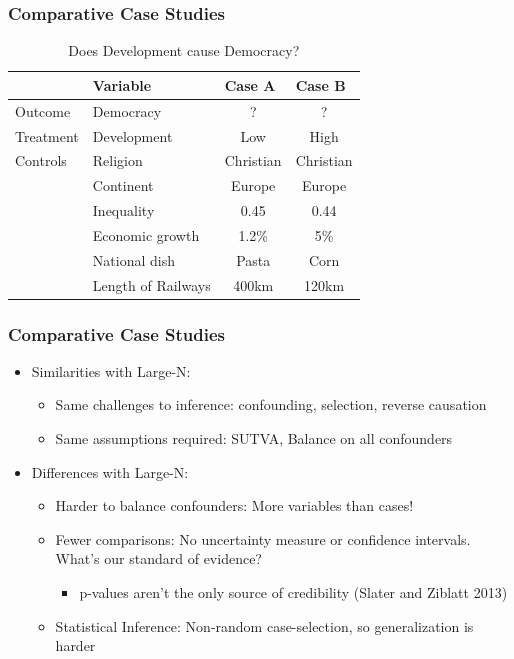 \documentclass[xcolor=x11names,compress]{beamer}\usepackage[]{graphicx}\usepackage[]{color}
\renewcommand{\(}{\begin{columns}}
\renewcommand{\)}{\end{columns}}
\newcommand{\<}[1]{\begin{column}{#1}}
\renewcommand{\>}{\end{column}}
\begin{document}
\begin{frame}
\frametitle{Comparative Case Studies}
\begin{table}[htbp]
  \centering
  \caption{Does Development cause Democracy?}
    \begin{tabular}{|r|l|c|c|}
    \hline
          & Variable & \multicolumn{1}{l|}{Case A} & \multicolumn{1}{l|}{Case B} \bigstrut\\
    \hline
    \multicolumn{1}{|l|}{Outcome} & Democracy & ?     & ? \bigstrut\\
    \hline
    \multicolumn{1}{|l|}{Treatment} & Development & Low   & High \bigstrut\\
    \hline
    \multicolumn{1}{|l|}{Controls} & Religion & Christian & Christian \bigstrut\\
    \hline
          & Continent & Europe & Europe \bigstrut\\
    \hline
          & Inequality & 0.45  & 0.44 \bigstrut\\
    \hline
          & Economic growth & 1.2\% & 5\% \bigstrut\\
    \hline
          & National dish & Pasta & Corn \bigstrut\\
    \hline
          & Length of Railways & 400km & 120km \bigstrut\\
    \hline
    \end{tabular}%
  \label{tab:addlabel}%
\end{table}%
\end{frame}

\begin{frame}
\frametitle{Comparative Case Studies}
\begin{itemize}
\item Similarities with Large-N:
\pause
\begin{itemize}
\item Same challenges to inference: confounding, selection, reverse causation
\pause
\item Same assumptions required: SUTVA, Balance on all confounders
\pause
\end{itemize}
\item Differences with Large-N:
\begin{itemize}
\item Harder to balance confounders: More variables than cases!
\pause
\item Fewer comparisons: No uncertainty measure or confidence intervals. What's our standard of evidence?
\pause
\begin{itemize}
\item p-values aren't the only source of credibility (Slater and Ziblatt 2013)
\end{itemize}
\pause
\item Statistical Inference: Non-random case-selection, so generalization is harder
\end{itemize}
\end{itemize}
\end{frame}
\end{document}
